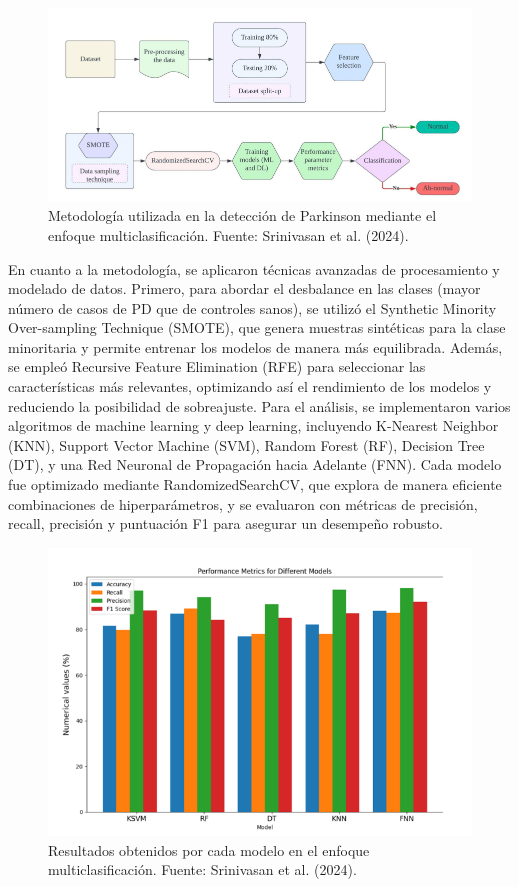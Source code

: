 \documentclass[listof=nochaptergap,12pt,times,authoryear]{report}
\begin{document}
\begin{figure}[H]
    \centering
    \includegraphics[width=\textwidth]{A2 - M.png}
    \caption{Metodología utilizada en la detección de Parkinson mediante el enfoque multiclasificación. Fuente: Srinivasan et al. (2024).}
    \label{fig:metodologia_multiclasificacion}
\end{figure}

En cuanto a la metodología, se aplicaron técnicas avanzadas de procesamiento y modelado de datos. Primero, para abordar el desbalance en las clases (mayor número de casos de PD que de controles sanos), se utilizó el Synthetic Minority Over-sampling Technique (SMOTE), que genera muestras sintéticas para la clase minoritaria y permite entrenar los modelos de manera más equilibrada. Además, se empleó Recursive Feature Elimination (RFE) para seleccionar las características más relevantes, optimizando así el rendimiento de los modelos y reduciendo la posibilidad de sobreajuste. Para el análisis, se implementaron varios algoritmos de machine learning y deep learning, incluyendo K-Nearest Neighbor (KNN), Support Vector Machine (SVM), Random Forest (RF), Decision Tree (DT), y una Red Neuronal de Propagación hacia Adelante (FNN). Cada modelo fue optimizado mediante RandomizedSearchCV, que explora de manera eficiente combinaciones de hiperparámetros, y se evaluaron con métricas de precisión, recall, precisión y puntuación F1 para asegurar un desempeño robusto.

\begin{figure}[H]
    \centering
    \includegraphics[width=\textwidth]{A2 - r2.png}
    \caption{Resultados obtenidos por cada modelo en el enfoque multiclasificación. Fuente: Srinivasan et al. (2024).}
    \label{fig:resultados_multiclasificacion}
\end{figure}
\end{document}
